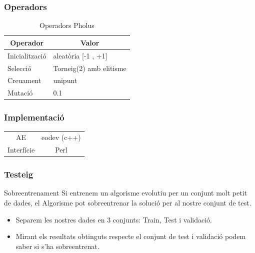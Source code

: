 \documentclass{beamer}
\begin{document}

\begin{frame}
\frametitle{Operadors}


\begin{table}
\centering
\begin{tabular}{|l|l|}
\hline
\multicolumn{1}{|c|}{\textbf{Operador }} & \multicolumn{1}{c|}{\textbf{ Valor}} \\
\hline
\hline
Inicialització & aleatòria [-1 , +1] \\
Selecció       & Torneig(2) amb elitisme  \\
Creuament       &  unipunt        \\
Mutació        &   0.1                  \\
\hline
\end{tabular}
\caption{Operadors Pholus}
\end{table}

\end{frame}

\begin{frame}
\frametitle{Implementació}
\begin{tabular}[h!]{|c|c|}
	AE                                         & eodev (c++)                \\ 
	Interfície & Perl    \\ 
\end{tabular}
\end{frame}

\begin{frame}
	\frametitle{Testeig}
	\begin{block}{Sobreentrenament}
		Si entrenem un algorisme evolutiu per un conjunt molt petit de dades, el Algorisme pot
		sobreentrenar la solució per al nostre conjunt de test.
	\end{block}
	\begin{itemize}
		\item Separem les nostres dades en 3 conjunts: Train, Test i validació.
		\item Mirant els resultats obtinguts respecte el conjunt de test i validació podem saber si
			s'ha sobreentrenat.
	\end{itemize}
\end{frame}
\end{document}

